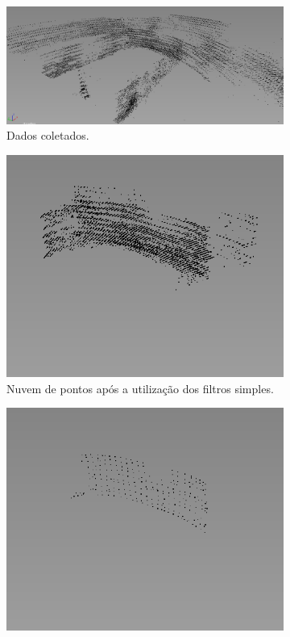 \begin{figure}[H]
    \centering
    \begin{subfigure}[t]{1\textwidth}
        \includegraphics[width=\textwidth]{dados/figuras/longe_original.png}
        \caption{Dados coletados.}
    \end{subfigure}
    \begin{subfigure}[t]{0.327\textwidth}
        \includegraphics[width=\textwidth]{dados/figuras/longe_1.png}
        \caption{Nuvem de pontos após a utilização dos filtros simples.}
    \end{subfigure}
    \begin{subfigure}[t]{0.327\textwidth}
        \includegraphics[width=\textwidth]{dados/figuras/longe_2.png}

\end{subfigure}
\end{figure}

